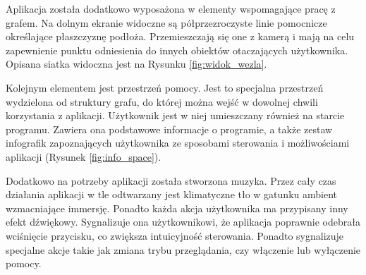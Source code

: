 
Aplikacja została dodatkowo wyposażona w elementy wspomagające pracę z grafem. Na dolnym ekranie widoczne są półprzezroczyste linie pomocnicze określające płaszczyznę podłoża. Przemieszczają się one z kamerą i mają na celu zapewnienie punktu odniesienia do innych obiektów otaczających użytkownika. Opisana siatka widoczna jest na Rysunku \ref{fig:widok_wezla}.

Kolejnym elementem jest przestrzeń pomocy. Jest to specjalna przestrzeń wydzielona od struktury grafu, do której można wejść w dowolnej chwili korzystania z aplikacji. Użytkownik jest w niej umieszczany również na starcie programu. Zawiera ona podstawowe informacje o programie, a także zestaw infografik zapoznających użytkownika ze sposobami sterowania i możliwościami aplikacji (Rysunek \ref{fig:info_space}).


Dodatkowo na potrzeby aplikacji została stworzona muzyka. Przez cały czas działania aplikacji w tle odtwarzany jest klimatyczne tło w gatunku ambient wzmacniające immersję. Ponadto każda akcja użytkownika ma przypisany inny efekt dźwiękowy. Sygnalizuje ona użytkownikowi, że aplikacja poprawnie odebrała wciśnięcie przycisku, co zwiększa intuicyjność sterowania. Ponadto sygnalizuje specjalne akcje takie jak zmiana trybu przeglądania, czy włączenie lub wyłączenie pomocy.